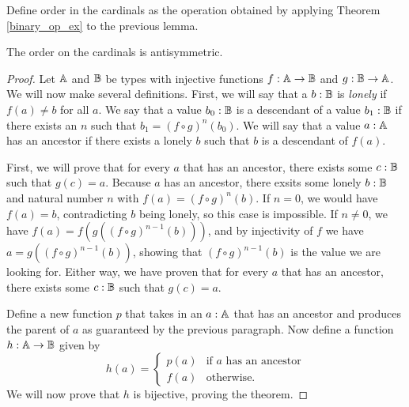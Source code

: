 \documentclass[../../math.tex]{subfiles}
\begin{document}
\begin{instance}
    Define order in the cardinals as the operation obtained by applying Theorem
    \ref{binary_op_ex} to the previous lemma.
\end{instance}

\begin{instance}
    The order on the cardinals is antisymmetric.
\end{instance}
\begin{proof}
    Let $\mathbb{A}$ and $\mathbb{B}$ be types with injective functions $f : \mathbb{A} \to \mathbb{B}$ and $g :
    \mathbb{B} \to \mathbb{A}$.  We will now make several definitions.  First, we will say that
    a $b : \mathbb{B}$ is \textit{lonely} if $f(a) \neq b$ for all $a$.  We say that a
    value $b_0 : \mathbb{B}$ is a descendant of a value $b_1 : \mathbb{B}$ if there exists an
    $n$ such that $b_1 = (f \circ g)^n(b_0)$.  We will say that a value $a : \mathbb{A}$
    has an ancestor if there exists a lonely $b$ such that $b$ is a descendant
    of $f(a)$.

    First, we will prove that for every $a$ that has an ancestor, there exists
    some $c : \mathbb{B}$ such that $g(c) = a$.  Because $a$ has an ancestor, there
    exsits some lonely $b : \mathbb{B}$ and natural number $n$ with $f(a) = (f \circ
    g)^n(b)$.  If $n = 0$, we would have $f(a) = b$, contradicting $b$ being
    lonely, so this case is impossible.  If $n \neq 0$, we have $f(a) = f(g((f
    \circ g)^{n-1}(b)))$, and by injectivity of $f$ we have $a = g((f \circ
    g)^{n-1}(b))$, showing that $(f \circ g)^{n-1}(b)$ is the value we are
    looking for.  Either way, we have proven that for every $a$ that has an
    ancestor, there exists some $c : \mathbb{B}$ such that $g(c) = a$.

    Define a new function $p$ that takes in an $a : \mathbb{A}$ that has an ancestor and
    produces the parent of $a$ as guaranteed by the previous paragraph.  Now
    define a function $h : \mathbb{A} \to \mathbb{B}$ given by
    \[
        h(a) = \begin{cases}
            p(a) &\text{if $a$ has an ancestor} \\
            f(a) &\text{otherwise.}
        \end{cases}
    \]
    We will now prove that $h$ is bijective, proving the theorem.


\end{proof}
\end{document}
